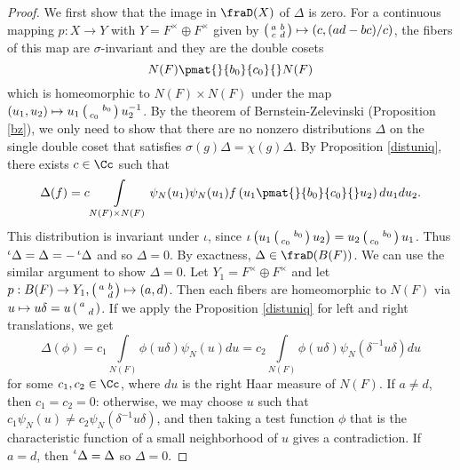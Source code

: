 \begin{proof}
We first show that the image in $\fraD(X)$ of $\Delta$ is zero. 
For a continuous mapping $p:X\to Y$ with $Y = F^{\times} \oplus F^{\times}$ given by $\left(\begin{smallmatrix} a & b \\ c & d \end{smallmatrix}\right) \mapsto (c, (ad-bc)/c)$, the fibers of this map are $\sigma$-invariant and they are the double cosets 
$$
N(F) \pmat{}{b_{0}}{c_{0}}{} N(F)
$$
which is homeomorphic to $N(F)\times N(F)$ under the map $(u_{1}, u_{2})\mapsto u_{1} \left(\begin{smallmatrix}  & b_{0} \\ c_{0} &  \end{smallmatrix}\right) u_{2}^{-1}$. By the theorem of Bernstein-Zelevinski (Proposition \ref{bz}), we only need to show that there are no nonzero distributions $\Delta$ on the single double coset that satisfies $\sigma(g)\Delta = \chi(g)\Delta$. 
By Proposition \ref{distuniq}, there exists $c\in \Cc$ such that 
$$
\Delta(f) = c \int\limits_{N(F)\times N(F)} \psi_{N}(u_{1})\psi_{N}(u_{1}) f\left( u_{1} \pmat{}{b_{0}}{c_{0}}{} u_{2}\right) du_{1}du_{2}.
$$
This distribution is invariant under $\iota$, since $\iota\left( u_{1} \left(\begin{smallmatrix}  & b_{0} \\ c_{0} &  \end{smallmatrix}\right) u_{2}\right) = u_{2}\left(\begin{smallmatrix}  & b_{0} \\ c_{0} &  \end{smallmatrix}\right) u_{1}$. Thus $\prescript{\iota}{}{}\Delta = \Delta = -\prescript{\iota}{}{}\Delta$ and so $\Delta = 0$. 
By exactness, $\Delta \in \fraD(B(F))$. We can use the similar argument to show $\Delta = 0$. 
Let $Y_{1} =F^{\times} \oplus F^{\times}$ and let $p:B(F) \to Y_{1}, \left(\begin{smallmatrix} a & b \\  & d \end{smallmatrix}\right) \mapsto (a, d)$. 
Then each fibers are homeomorphic to $N(F)$ via $u\mapsto u\delta = u\left(\begin{smallmatrix} a &  \\  & d \end{smallmatrix}\right)$. If we apply the Proposition \ref{distuniq} for left and right translations, we get
$$
\Delta(\phi) = c_{1}\int\limits_{N(F)} \phi(u\delta)\psi_{N}(u)du = c_{2} \int\limits_{N(F)} \phi(u\delta) \psi_{N}(\delta^{-1}u\delta) du
$$
for some $c_{1}, c_{2}\in \Cc$, where $du$ is the right Haar measure of $N(F)$. If $a\neq d$, then $c_{1} =c_{2} = 0$: otherwise, we may choose $u$ such that $c_{1}\psi_{N}(u) \neq c_{2}\psi_{N}(\delta^{-1}u\delta)$, and then taking a test function $\phi$ that is the characteristic function of a small neighborhood of $u$ gives a contradiction. 
If $a = d$, then $\prescript{\iota}{}\Delta = \Delta$ so $\Delta = 0$. 
\end{proof}



